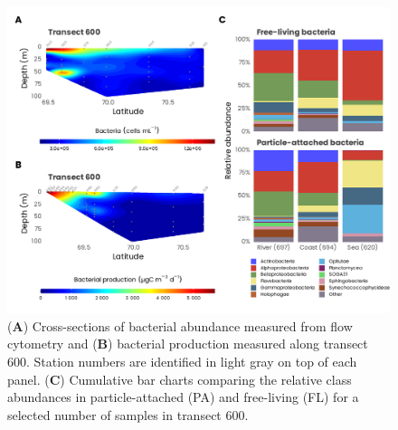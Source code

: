 \documentclass[essd, manuscript]{copernicus}
\begin{document}
\clearpage

\begin{figure}[H]
    \centering
    \includegraphics[scale = 1]{../../../graphs/fig14.pdf}
    \caption{(\textbf{A}) Cross-sections of bacterial abundance measured from flow cytometry and (\textbf{B}) bacterial production measured along transect 600. Station numbers are identified in light gray on top of each panel. (\textbf{C}) Cumulative bar charts comparing the relative class abundances in particle-attached (PA) and free-living (FL) for a selected number of samples in transect 600.}
\end{figure}

\clearpage



\appendix


\noappendix       %



\end{document}
